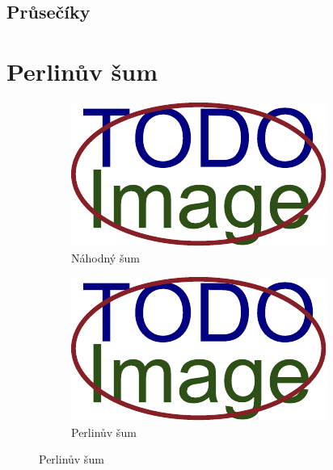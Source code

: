 \subsection{Průsečíky}\label{ch:teorie:lineární-algebra:průsečíky}


\section{Perlinův šum}\label{ch:teorie:perlin}

\begin{figure}[H]
	\centering
	\begin{subfigure}{0.32\textwidth}
		\includegraphics[width=\textwidth]{obrazky-figures/placeholder.pdf}
		\caption{Náhodný šum}
		\label{fig:perlin:porovnání:náhodný}
	\end{subfigure}
	\hfill
	\begin{subfigure}{0.32\textwidth}
		\includegraphics[width=\textwidth]{obrazky-figures/placeholder.pdf}
		\caption{Perlinův šum}
		\label{fig:perlin:porovnání:perlin}

\end{subfigure}
\end{figure}
